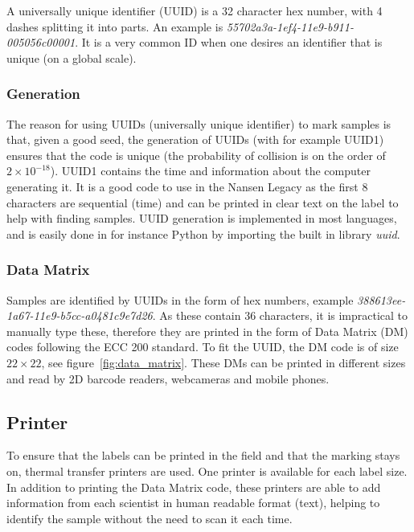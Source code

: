 \documentclass[a4paper,english, 11pt]{article}
\begin{document}
A universally unique identifier (UUID) is a 32 character hex number, with 4 dashes splitting it into parts. An example is \emph{55702a3a-1ef4-11e9-b911-005056c00001}. It is a very common ID when one desires an identifier that is unique (on a global scale).

\subsubsection{Generation} %
\label{ssub:Generation}

The reason for using UUIDs (universally unique identifier) to mark samples is that, given a good seed, the generation of UUIDs (with for example UUID1) ensures that the code is unique (the probability of collision is on the order of $ 2\times10^{-18}$). UUID1 contains the time and information about the computer generating it. It is a good code to use in the Nansen Legacy as the first 8 characters are sequential (time) and can be printed in clear text on the label to help with finding samples. UUID generation is implemented in most languages, and is easily done in for instance Python by importing the built in library \emph{uuid}. 


\subsubsection{Data Matrix} %
\label{ssub:DM}
Samples are identified by UUIDs in the form of hex numbers, example \emph{388613ee-1a67-11e9-b5cc-a0481c9e7d26}. As these contain 36 characters, it is impractical to manually type these, therefore they are printed in the form of  Data Matrix (DM) codes following the ECC 200 standard. To fit the UUID, the DM code is of size $22\times22$, see figure~\ref{fig:data_matrix}. These DMs can be printed in different sizes and read by 2D barcode readers, webcameras and mobile phones. 



\subsection{Printer} %
\label{sub:Printer}
To ensure that the labels can be printed in the field and that the marking stays on, thermal transfer printers are used. One printer is available for each label size. In addition to printing the Data Matrix code, these printers are able to add information from each scientist in human readable format (text), helping to identify the sample without the need to scan it each time.
\end{document}
